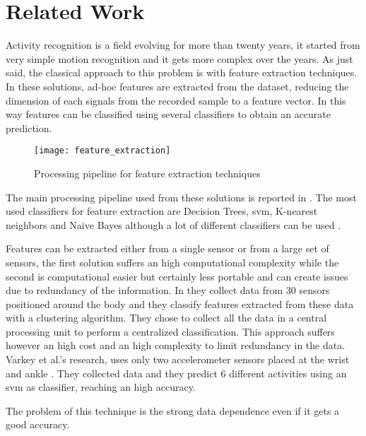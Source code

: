 
\section{Related Work}
\label{sec:related_work}

Activity recognition is a field evolving for more than twenty years, it started from very simple motion recognition and it gets more complex over the years.
As just said, the classical approach to this problem is with feature extraction techniques.
In these solutions, ad-hoc features are extracted from the dataset, reducing the dimension of each signals from the recorded sample to a feature vector.
In this way features can be classified using several classifiers to obtain an accurate prediction.

\begin{figure}[!ht]
  \centering
  \texttt{[image: feature\_extraction]}
  \caption{Processing pipeline for feature extraction techniques}
  \label{fig:feature_extraction}
\end{figure}

The main processing pipeline used from these solutions is reported in .
The most used classifiers for feature extraction are Decision Trees, \gls{svm}, K-nearest neighbors and Naive Bayes although a lot of different classifiers can be used \cite{Ravi05}.

Features can be extracted either from a single sensor or from a large set of sensors, the first solution suffers an high computational complexity while the second is computational easier but certainly less portable and can create issues due to redundancy of the information.
In \cite{Laerhoven02} they collect data from 30 sensors positioned around the body and they classify features extracted from these data with a clustering algorithm. They chose to collect all the data in a central processing unit to perform a centralized classification. This approach suffers however an high cost and an high complexity to limit redundancy in the data.
Varkey et al.'s research, uses only two accelerometer sensors placed at the wrist and ankle \cite{Varkey2012}. They collected data and they predict 6 different activities using an \gls{svm} as classifier, reaching an high accuracy.

The problem of this technique is the strong data dependence even if it gets a good accuracy.

